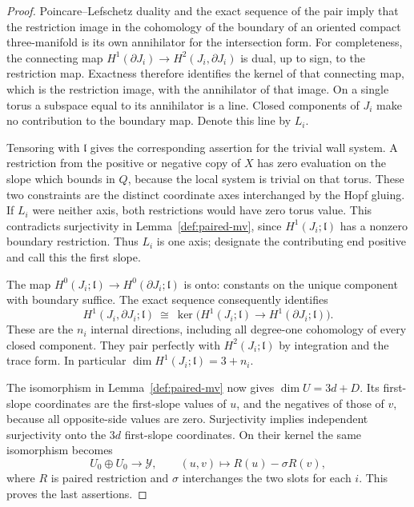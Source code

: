 \begin{proof}
Poincare--Lefschetz duality \cite[Theorem~3.43]{Hatcher2002} and the exact sequence of the pair imply
that the restriction image in the cohomology of the boundary of
an oriented compact three-manifold is its own annihilator for
the intersection form.  For completeness, the connecting map
\(H^1(\partial J_i)\to H^2(J_i,\partial J_i)\) is dual, up to sign,
to the restriction map.  Exactness therefore identifies the
kernel of that connecting map, which is the restriction image,
with the annihilator of that image.  On a single torus a subspace
equal to its annihilator is a line.  Closed components of \(J_i\)
make no contribution to the boundary map.  Denote this line by
\(L_i\).

Tensoring with \(\mathfrak l\) gives the corresponding assertion
for the trivial wall system.  A restriction from the positive or
negative copy of \(X\) has zero evaluation on the slope which
bounds in \(Q\), because the local system is trivial on that
torus.  These two constraints are the distinct coordinate axes
interchanged by the Hopf gluing.  If \(L_i\) were neither axis,
both restrictions would have zero torus value.  This contradicts
surjectivity in Lemma~\ref{def:paired-mv}, since
\(H^1(J_i;\mathfrak l)\) has a nonzero boundary restriction.
Thus \(L_i\) is one axis; designate the contributing end positive
and call this the first slope.

The map \(H^0(J_i;\mathfrak l)\to
H^0(\partial J_i;\mathfrak l)\) is onto: constants on the unique
component with boundary suffice.  The exact sequence consequently
identifies
\begin{equation}
 H^1(J_i,\partial J_i;\mathfrak l)
 \ \cong\
 \ker\bigl(H^1(J_i;\mathfrak l)
                  \longrightarrow H^1(\partial J_i;\mathfrak l)\bigr).
 \label{def:relative-identification}
\end{equation}
These are the \(n_i\) internal directions, including all degree-one
cohomology of every closed component.  They pair perfectly with
\(H^2(J_i;\mathfrak l)\) by integration and the trace form.
In particular \(\dim H^1(J_i;\mathfrak l)=3+n_i\).

The isomorphism in Lemma~\ref{def:paired-mv} now gives
\(\dim U=3d+D\).  Its first-slope coordinates are the first-slope
values of \(u\), and the negatives of those of \(v\), because all
opposite-side values are zero.  Surjectivity implies independent
surjectivity onto the \(3d\) first-slope coordinates.  On their
kernel the same isomorphism becomes
\[
 U_0\oplus U_0\longrightarrow\mathcal Y,\qquad
 (u,v)\longmapsto R(u)-\sigma R(v),
\]
where \(R\) is paired restriction and \(\sigma\) interchanges the
two slots for each \(i\).  This proves the last assertions.
\end{proof}

